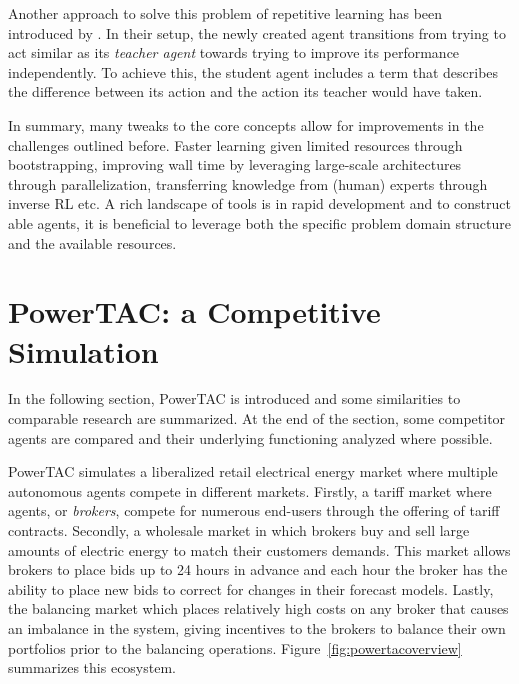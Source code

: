 Another approach to solve this problem of repetitive learning has been introduced by \citet{schmitt2018kickstarting}. In
their setup, the newly created agent transitions from trying to act similar as its \emph{teacher agent} towards trying
to improve its performance independently. To achieve this, the student agent includes a term that describes the
difference between its action and the action its teacher would have taken.

In summary, many tweaks to the core concepts allow for improvements in the challenges outlined before. Faster learning given limited
resources through bootstrapping, improving wall time by leveraging large-scale architectures through
parallelization, transferring knowledge from (human) experts through inverse \ac{RL} etc. A rich landscape of tools is
in rapid development and to construct able agents, it is beneficial to leverage both the specific problem domain
structure and the available resources.


\section{PowerTAC: a Competitive Simulation}%
\label{sec:powertac_a_competitive_simulation}


In the following section, \acl{PowerTAC} is introduced and some similarities to comparable
research are summarized. At the end of the section, some competitor agents are compared and their underlying
functioning analyzed where possible.

\ac{PowerTAC} simulates a liberalized retail electrical energy market where multiple autonomous agents compete in
different markets. Firstly, a tariff market where agents, or \emph{brokers}, compete for numerous end-users through the
offering of tariff contracts. Secondly, a wholesale market in which brokers buy and sell large amounts of electric
energy to match their customers demands. This market allows brokers to place bids up to 24 hours in advance and each
hour the broker has the ability to place new bids to correct for changes in their forecast models. Lastly, the balancing
market which places relatively high costs on any broker that causes an imbalance in the system, giving incentives to the
brokers to balance their own portfolios prior to the balancing operations. Figure~\ref{fig:powertacoverview} summarizes
this ecosystem.

